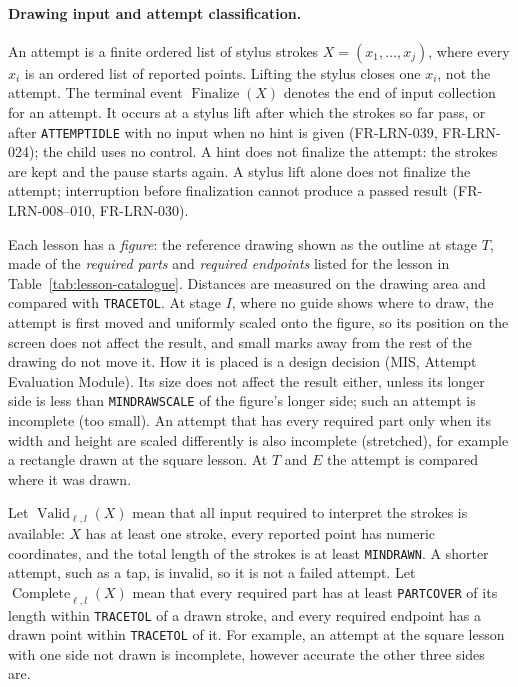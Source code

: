 \documentclass[12pt]{article}
\renewcommand{\_}{\textunderscore\allowbreak}%
\begin{document}
\paragraph{Drawing input and attempt classification.}
An attempt is a finite ordered list of stylus strokes $X=(x_1,\ldots,x_j)$,
where every $x_i$ is an ordered list of reported points. Lifting the stylus
closes one $x_i$, not the attempt. The terminal event
$\operatorname{Finalize}(X)$ denotes the end of input collection for an attempt.
It occurs at a stylus lift after which the strokes so far pass, or after
\texttt{ATTEMPT\_IDLE} with no input when no hint is given (FR-LRN-039,
FR-LRN-024); the child uses no control. A hint does not finalize the attempt:
the strokes are kept and the pause starts again. A
stylus lift alone does not finalize the attempt; interruption before
finalization cannot produce a passed result (FR-LRN-008--010, FR-LRN-030).

Each lesson has a \emph{figure}: the reference drawing shown as the outline at
stage $T$, made of the \emph{required parts} and \emph{required endpoints}
listed for the lesson in Table~\ref{tab:lesson-catalogue}. Distances are
measured on the drawing area and compared with \texttt{TRACE\_\allowbreak TOL}.
At stage $I$, where no guide shows where to draw, the attempt is first moved and
uniformly scaled onto the figure, so its position on the screen does not affect
the result, and small marks away from the rest of the drawing do not move it.
How it is placed is a design decision (MIS, Attempt Evaluation Module). Its size
does not affect the result either, unless its longer side is less than
\texttt{MIN\_DRAW\_SCALE} of the figure's longer side; such an attempt is
incomplete (too small). An attempt that has every required part only when its
width and height are scaled differently is also incomplete (stretched), for
example a rectangle drawn at the square lesson. At $T$ and $E$ the attempt is
compared where it was drawn.

Let $\operatorname{Valid}_{\ell,l}(X)$ mean that all input required to interpret
the strokes is available: $X$ has at least one stroke, every reported point has
numeric coordinates, and the total length of the strokes is at least
\texttt{MIN\_DRAWN}. A shorter attempt, such as a tap, is invalid, so it is not
a failed attempt. Let $\operatorname{Complete}_{\ell,l}(X)$ mean
that every required part has at least \texttt{PART\_\allowbreak COVER} of its
length within \texttt{TRACE\_\allowbreak TOL} of a drawn stroke, and every
required endpoint has a drawn point within \texttt{TRACE\_\allowbreak TOL} of
it. For example, an attempt at the square lesson with one side not drawn is
incomplete, however accurate the other three sides are.
\end{document}
